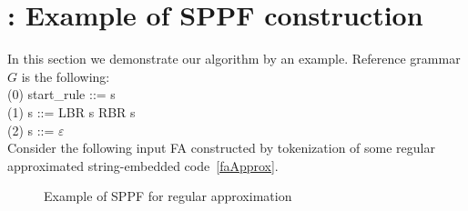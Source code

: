 \appendix

\section{\appendixname: Example of SPPF construction}\label{example}

In this section we demonstrate our algorithm by an example. Reference grammar $G$ is the following:\\
(0) start\_rule ::= s \\
(1) s ::= LBR s RBR s\\
(2) s ::= $\varepsilon$ \\

Consider the following input FA constructed by tokenization of some regular approximated string-embedded code~\ref{faApprox}.
 \begin{figure}[!ht]
   \hfill
    \caption{Example of SPPF for regular approximation}
    \label{fig:SPPFforReg}
 \end{figure}

